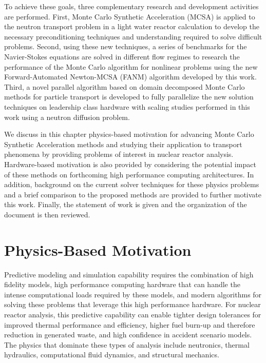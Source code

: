 To achieve these goals, three complementary research and development
activities are performed. First, Monte Carlo Synthetic Acceleration
(MCSA) is applied to the neutron transport problem in a light water
reactor calculation to develop the necessary preconditioning
techniques and understanding required to solve difficult
problems. Second, using these new techniques, a series of benchmarks
for the Navier-Stokes equations are solved in different flow regimes
to research the performance of the Monte Carlo algorithm for nonlinear
problems using the new Forward-Automated Newton-MCSA (FANM) algorithm
developed by this work. Third, a novel parallel algorithm based on
domain decomposed Monte Carlo methods for particle transport is
developed to fully parallelize the new solution techniques on
leadership class hardware with scaling studies performed in this work
using a neutron diffusion problem.

We discuss in this chapter physics-based motivation for advancing
Monte Carlo Synthetic Acceleration methods and studying their
application to transport phenomena by providing problems of interest
in nuclear reactor analysis. Hardware-based motivation is also
provided by considering the potential impact of these methods on
forthcoming high performance computing architectures. In addition,
background on the current solver techniques for these physics problems
and a brief comparison to the proposed methods are provided to further
motivate this work. Finally, the statement of work is given and the
organization of the document is then reviewed.

\section{Physics-Based Motivation}
\label{sec:physics_motivation}
Predictive modeling and simulation capability requires the combination
of high fidelity models, high performance computing hardware that can
handle the intense computational loads required by these models, and
modern algorithms for solving these problems that leverage this high
performance hardware. For nuclear reactor analysis, this predictive
capability can enable tighter design tolerances for improved thermal
performance and efficiency, higher fuel burn-up and therefore
reduction in generated waste, and high confidence in accident scenario
models. The physics that dominate these types of analysis include
neutronics, thermal hydraulics, computational fluid dynamics, and
structural mechanics.

